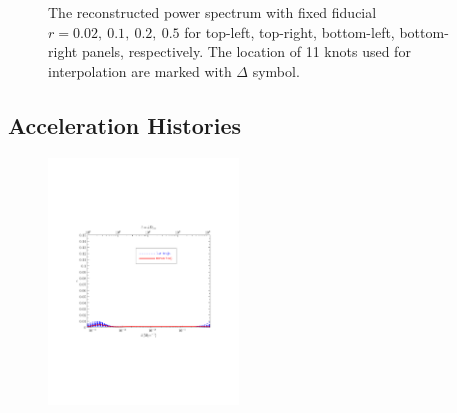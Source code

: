 \documentclass[11pt]{article}
\def \halffigwidth{0.45\textwidth}
\begin{document}
\begin{figure}
  \caption{The reconstructed power spectrum with fixed fiducial $r = 0.02,\ 0.1,\ 0.2,\ 0.5$ for top-left, top-right, bottom-left, bottom-right panels, respectively. The location of 11 knots used for interpolation are marked with $\Delta$ symbol. \label{fig:traj_power_fixr}}
\end{figure}


\subsection{Acceleration Histories}

\begin{figure}
  \includegraphics[width=\halffigwidth,  trim = 1in 3in 1in 3in]{nobicep_spline0_p11_r0d02_eps_traj.pdf}%

\end{figure}
\end{document}
